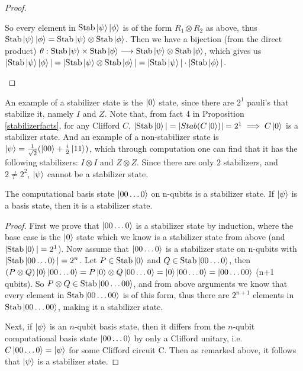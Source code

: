 \documentclass[12pt]{dalthesis}
\begin{document}
\begin{proof}
\begin{enumerate}
 So every element in $\text{Stab}\ket{\psi}\ket{\phi}$ is of the form $R_1 \otimes R_2$ as above, thus $\text{Stab}\ket{\psi}\ket{\phi} = \text{Stab}\ket{\psi} \otimes \text{Stab}\ket{\phi}$. Then we have a bijection (from the direct product) $\theta:\text{Stab}\ket{\psi} \times \text{Stab}\ket{\phi} \longrightarrow  \text{Stab}\ket{\psi} \otimes \text{Stab}\ket{\phi}$, which gives us $|\text{Stab}\ket{\psi}\ket{\phi}| = |\text{Stab}\ket{\psi} \otimes \text{Stab}\ket{\phi}| = |\text{Stab}\ket{\psi}| \cdot |\text{Stab}\ket{\phi}|$.
\end{enumerate}
\end{proof}



An example of a stabilizer state is the $\ket{0}$ state, since there are $2^1$ pauli's that stabilize it, namely $I$ and $Z$. Note that, from fact 4 in Proposition \ref{stabilizerfacts}, for any Clifford $C$, $|\text{Stab}\ket{0}| = |Stab(C\ket{0})| = 2^1 \implies C\ket{0}$ is a stabilizer state. And an example of a non-stabilizer state is $\ket{\psi} = \frac{1}{\sqrt{2}}(\ket{00} + \frac{i}{2} \ket{11})$, which through computation one can find that it has the following stabilizers: $I \otimes I$ and $Z \otimes Z$. Since there are only $2$ stabilizers, and $2 \neq 2^2$, $\ket{\psi}$ cannot be a stabilizer state.

\begin{corollary}
The computational basis state $\ket{00 \dots 0}$ on n-qubits is a stabilizer state. If $\ket{\psi}$ is a basis state, then it is a stabilizer state. 
\end{corollary}
\begin{proof}
First we prove that $\ket{00 \dots 0}$ is a stabilizer state by induction, where the base case is the $\ket{0}$ state which we know is a stabilizer state from above (and $|\text{Stab}\ket{0}| = 2^1$). Now assume that $\ket{00 \dots 0}$ is a stabilizer state on n-qubits with $|\text{Stab}\ket{00 \dots 0}| = 2^n$. Let $P \in \text{Stab}\ket{0}$ and $Q \in \text{Stab}\ket{00 \dots 0}$, then $(P \otimes Q)\ket{0}\ket{00 \dots 0} = P\ket{0} \otimes Q\ket{00 \dots 0} = \ket{0}\ket{00 \dots 0} = \ket{00 \dots 00}$ (n+1 qubits). So $P \otimes Q \in \text{Stab}\ket{00 \dots 00}$, and from above arguments we know that every element in $\text{Stab}\ket{00 \dots 00}$ is of this form, thus there are $2^{n+1}$ elements in $\text{Stab}\ket{00 \dots 00}$, making it a stabilizer state.


Next, if $\ket{\psi}$ is an $n$-qubit basis state, then it differs from the $n$-qubit computational basis state $\ket{00 \ldots 0}$ by only a Clifford unitary, i.e. $C\ket{00 \ldots 0} = \ket{\psi}$ for some Clifford circuit C. Then as remarked above, it follows that $\ket{\psi}$ is a stabilizer state.
\end{proof}
\end{document}
